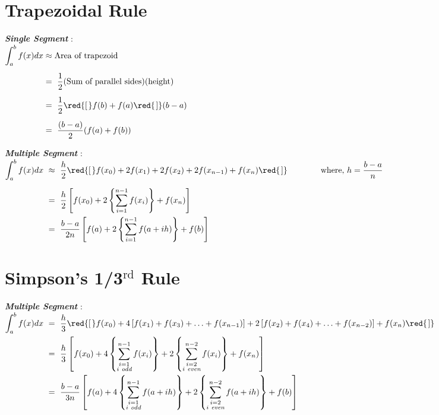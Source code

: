 \section*{Trapezoidal Rule}

\textbf{\textit{Single Segment}} :\\[0.5em]
$\begin{aligned}
   \int_{a}^{b} f(x) dx & \approx \text{Area of trapezoid} \\[0.5em]
   & = \ \frac{1}{2}(\text{Sum of parallel sides})(\text{height}) \\[0.5em]
   & = \ \frac{1}{2}\red{\left[\right.}f(b) + f(a)\red{\left.\right]}(b-a) \\[0.5em]
   & = \ \frac{(b-a)}{2}(f(a) + f(b))
\end{aligned}$


\textbf{\textit{Multiple Segment}} :\\[0.5em]
$\begin{aligned}
   \int_{a}^{b} f(x) dx \ &\approx \ \frac{h}{2}\red{\left[\right.}f(x_0) + 2f(x_1) + 2f(x_2) + 2f(x_{n-1}) + f(x_n)\red{\left.\right]} \qquad \qquad \text{where, } h=\frac{b-a}{n} \\[0.5em]
   & = \ \frac{h}{2}\left[f(x_0) + 2\left\{\sum_{i=1}^{n-1}f(x_i)\right\} + f(x_n)\right]\\
   & = \ \frac{b-a}{2n}\left[f(a) + 2\left\{\sum_{i=1}^{n-1}f(a+ih)\right\} + f(b)\right]
\end{aligned}$


\section*{Simpson's 1/3$^\text{rd}$ Rule}

\textbf{\textit{Multiple Segment}} :\\[0.5em]
$\begin{aligned}
   \int_{a}^{b} f(x) dx \ &= \ \frac{h}{3}\red{\left[\right.}f(x_0) + 4\left[f(x_1) + f(x_3) + \ldots + f(x_{n-1})\right] + 2\left[f(x_2) + f(x_4) + \ldots + f(x_{n-2})\right] + f(x_n)\red{\left.\right]} \\
   & = \ \frac{h}{3}\left[f(x_0) + 4\left\{\sum_{\substack{i = 1 \\ i \textit{ odd}}}^{n-1}f(x_i)\right\} + 2\left\{\sum_{\substack{i = 2 \\ i \textit{ even}}}^{n-2}f(x_i)\right\} + f(x_n)\right]\\
   & = \ \frac{b-a}{3n}\left[f(a) + 4\left\{\sum_{\substack{i = 1 \\ i \textit{ odd}}}^{n-1}f(a+ih)\right\} + 2\left\{\sum_{\substack{i = 2 \\ i \textit{ even}}}^{n-2}f(a+ih)\right\} + f(b)\right]
\end{aligned}$

